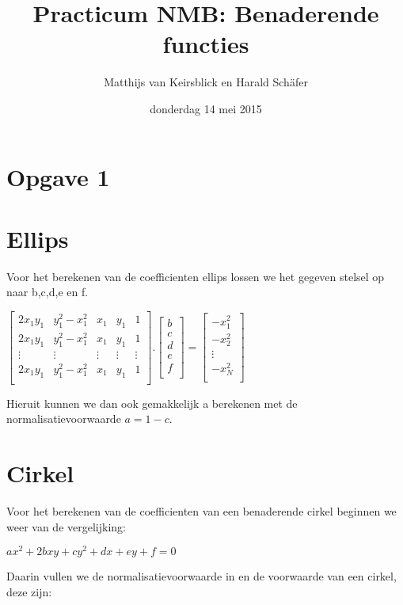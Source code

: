 \documentclass[]{article}
\title{Practicum NMB: Benaderende functies}
\author{Matthijs van Keirsblick en Harald Sch\"{a}fer}
\date{donderdag 14 mei 2015}
\newcommand{\opgave}[1]{\pagebreak\section*{Opgave #1}}
\begin{document}
\maketitle
\opgave{1}
\section*{Ellips}
Voor het berekenen van de coefficienten ellips lossen we het gegeven stelsel op naar b,c,d,e en f.
\\

 \begin{center}
 $
 \begin{bmatrix}
  2x_{1}y_{1} & y_{1}^2-x_{1}^2 & x_{1} & y_{1} & 1 \\
   2x_{1}y_{1} & y_{1}^2-x_{1}^2 & x_{1} & y_{1} & 1 \\
  \vdots  & \vdots  & \vdots & \vdots & \vdots \\
   2x_{1}y_{1} & y_{1}^2-x_{1}^2 & x_{1} & y_{1} & 1 \\
 \end{bmatrix}
 .
  \begin{bmatrix}
  b\\
  c\\
  d\\
  e\\
  f\\
  \end{bmatrix}
  =
   \begin{bmatrix}
    -x^2_1\\
   -x^2_2\\
    \vdots\\
   -x^2_N\\
    \end{bmatrix}
    $
     \end{center}

\noindent Hieruit kunnen we dan ook gemakkelijk a berekenen met de normalisatievoorwaarde $a = 1-c$.
\\




\section*{Cirkel}
\noindent Voor het berekenen van de coefficienten van een benaderende cirkel beginnen we weer van de vergelijking:

 \begin{center}
 $ax^2 +2bxy + cy^2 + dx +  ey + f = 0$
 \end{center}
Daarin vullen we de normalisatievoorwaarde in en de voorwaarde van een cirkel, deze zijn:
\end{document}
